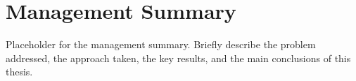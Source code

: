 \chapter*{Management Summary}

Placeholder for the management summary. Briefly describe the problem addressed, the approach taken, the key results, and the main conclusions of this thesis.

